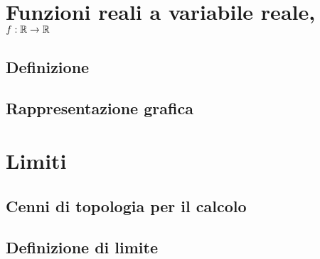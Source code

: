 \documentclass[letterpaper,10pt,english]{jupyterBook}
\begin{document}
\sphinxstepscope


\section{Funzioni reali a variabile reale, \protect\( f: \mathbb{R} \rightarrow \mathbb{R} \protect\)}
\label{\detokenize{ch/infinitesimal_calculus/real_functions:funzioni-reali-a-variabile-reale-f-mathbb-r-rightarrow-mathbb-r}}\label{\detokenize{ch/infinitesimal_calculus/real_functions:infinitesimal-calculus-real-functions}}\label{\detokenize{ch/infinitesimal_calculus/real_functions::doc}}

\subsection{Definizione}
\label{\detokenize{ch/infinitesimal_calculus/real_functions:definizione}}\label{\detokenize{ch/infinitesimal_calculus/real_functions:infinitesimal-calculus-real-functions-def}}

\subsection{Rappresentazione grafica}
\label{\detokenize{ch/infinitesimal_calculus/real_functions:rappresentazione-grafica}}\label{\detokenize{ch/infinitesimal_calculus/real_functions:infinitesimal-calculus-real-functions-graph}}
\sphinxstepscope


\section{Limiti}
\label{\detokenize{ch/infinitesimal_calculus/limits:limiti}}\label{\detokenize{ch/infinitesimal_calculus/limits:infinitesimal-calculus-limits}}\label{\detokenize{ch/infinitesimal_calculus/limits::doc}}

\subsection{Cenni di topologia per il calcolo}
\label{\detokenize{ch/infinitesimal_calculus/limits:cenni-di-topologia-per-il-calcolo}}
\sphinxAtStartPar
{} 


\subsection{Definizione di limite}
\label{\detokenize{ch/infinitesimal_calculus/limits:definizione-di-limite}}
\end{document}
